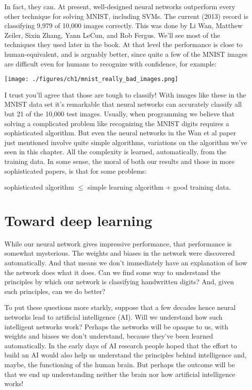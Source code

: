 \documentclass[a4paper,twoside,10pt]{book}
\begin{document}
In fact, they can. At present, well-designed neural networks outperform every other technique for solving MNIST, including SVMs. The current (2013) record is classifying 9,979 of 10,000 images correctly. This was done by Li Wan, Matthew Zeiler, Sixin Zhang, Yann LeCun, and Rob Fergus. We'll see most of the techniques they used later in the book. At that level the performance is close to human-equivalent, and is arguably better, since quite a few of the MNIST images are difficult even for humans to recognize with confidence, for example:
\begin{center}
	\texttt{[image: ./figures/ch1/mnist\_really\_bad\_images.png]}
\end{center}
I trust you'll agree that those are tough to classify! With images like these in the MNIST data set it's remarkable that neural networks can accurately classify all but 21 of the 10,000 test images. Usually, when programming we believe that solving a complicated problem like recognizing the MNIST digits requires a sophisticated algorithm. But even the neural networks in the Wan et al paper just mentioned involve quite simple algorithms, variations on the algorithm we've seen in this chapter. All the complexity is learned, automatically, from the training data. In some sense, the moral of both our results and those in more sophisticated papers, is that for some problems:
\begin{center}
sophisticated algorithm $\le$ simple learning algorithm + good training data.
\end{center}
\section{Toward deep learning}
\label{sec:1.8}
While our neural network gives impressive performance, that performance is somewhat mysterious. The weights and biases in the network were discovered automatically. And that means we don't immediately have an explanation of how the network does what it does. Can we find some way to understand the principles by which our network is classifying handwritten digits? And, given such principles, can we do better?

To put these questions more starkly, suppose that a few decades hence neural networks lead to artificial intelligence (AI). Will we understand how such intelligent networks work? Perhaps the networks will be opaque to us, with weights and biases we don't understand, because they've been learned automatically. In the early days of AI research people hoped that the effort to build an AI would also help us understand the principles behind intelligence and, maybe, the functioning of the human brain. But perhaps the outcome will be that we end up understanding neither the brain nor how artificial intelligence works!
\end{document}
